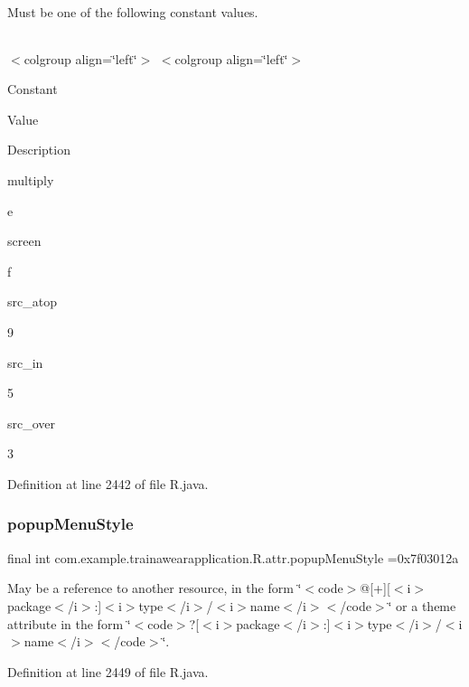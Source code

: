 Must be one of the following constant values.

\tabulinesep=1mm
\begin{longtabu}spread 0pt [c]{*{0}{|X[-1]}|}
\hline
\end{longtabu}
$<$colgroup align=\char`\"{}left\char`\"{}$>$ $<$colgroup align=\char`\"{}left\char`\"{}$>$ 

Constant

Value

Description 

multiply

e

screen

f

src\+\_\+atop

9

src\+\_\+in

5

src\+\_\+over

3

Definition at line 2442 of file R.\+java.

\mbox{\label{classcom_1_1example_1_1trainawearapplication_1_1_r_1_1attr_a1cb796186bef2027d1d1a138455631c4}} 
\subsubsection{\texorpdfstring{popupMenuStyle}{popupMenuStyle}}
{\footnotesize\ttfamily final int com.\+example.\+trainawearapplication.\+R.\+attr.\+popup\+Menu\+Style =0x7f03012a\hspace{0.3cm}{\ttfamily [static]}}

May be a reference to another resource, in the form \char`\"{}$<$code$>$@\mbox{[}+\mbox{]}\mbox{[}$<$i$>$package$<$/i$>$\+:\mbox{]}$<$i$>$type$<$/i$>$/$<$i$>$name$<$/i$>$$<$/code$>$\char`\"{} or a theme attribute in the form \char`\"{}$<$code$>$?\mbox{[}$<$i$>$package$<$/i$>$\+:\mbox{]}$<$i$>$type$<$/i$>$/$<$i$>$name$<$/i$>$$<$/code$>$\char`\"{}. 

Definition at line 2449 of file R.\+java.

\mbox{\label{classcom_1_1example_1_1trainawearapplication_1_1_r_1_1attr_a60e108fec02e62dc5b3a785f63c8e58f}} 
